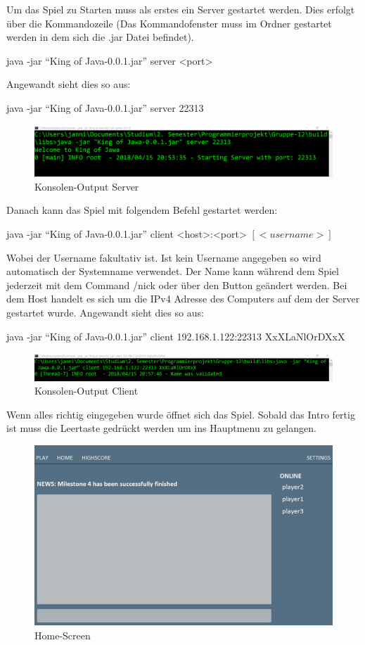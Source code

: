\documentclass{scrartcl}
\newcommand{\n}{\newline}
\begin{document}
Um das Spiel zu Starten muss als erstes ein Server gestartet werden. Dies erfolgt über die Kommandozeile (Das Kommandofenster muss im Ordner gestartet werden in dem sich die .jar Datei befindet).
\begin{center}
    java -jar “King of Java-0.0.1.jar” server <port>
\end{center}
Angewandt sieht dies so aus:
\begin{center}
    java -jar “King of Java-0.0.1.jar” server 22313
\end{center}
\begin{figure}[H]
	\includegraphics[width=\linewidth]{CMDserver.png}
	\caption{Konsolen-Output Server}
	\label{fig:map1}
\end{figure}
Danach kann das Spiel mit folgendem Befehl gestartet werden:
\begin{center}
    java -jar “King of Java-0.0.1.jar” client <host>:<port> $[<username>]$ 
\end{center}
Wobei der Username fakultativ ist. Ist kein Username angegeben so wird automatisch der Systemname verwendet. Der Name kann während dem Spiel jederzeit mit dem Command /nick oder über den Button geändert werden.\n
Bei dem Host handelt es sich um die IPv4 Adresse des Computers auf dem der Server gestartet wurde. \n
Angewandt sieht dies so aus:
\begin{center}
    java -jar “King of Java-0.0.1.jar” client 192.168.1.122:22313 XxXLaNlOrDXxX
\end{center}
\begin{figure}[H]
	\includegraphics[width=\linewidth]{CMDclient.png}
	\caption{Konsolen-Output Client}
	\label{fig:map1}
\end{figure}
\pagebreak
Wenn alles richtig eingegeben wurde öffnet sich das Spiel. Sobald das Intro fertig ist muss die Leertaste gedrückt werden um ins Hauptmenu zu gelangen.
\begin{figure}[H]
	\includegraphics[width=\linewidth]{HomeScreen.JPG}
	\caption{Home-Screen}
	\label{fig:HomeScreen}
\end{figure} 
\end{document}
